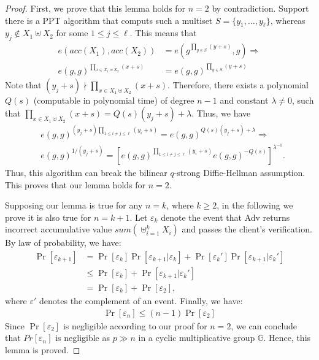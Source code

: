 \begin{proof}
  First, we prove that this lemma holds for $n=2$ by contradiction. Support there is a PPT algorithm that computs such a multiset $S = \{y_1, \dots, y_{\ell}\}$, whereas $y_j \notin X_1 \uplus X_2$ for some $1 \le j \le \ell$. This means that
  \begin{align*}
    e(acc(X_1), acc(X_2)) &= e(g^{\prod_{y \in S} (y+s)}, g) \Rightarrow \\
    {e(g, g)}^{\prod_{x \in X_1 \uplus X_2} (x+s) } &= {e(g, g)}^{\prod_{y \in S} (y+s)}
  \end{align*}
  Note that $(y_j + s)  \nmid \prod_{x \in X_1 \uplus X_2} (x+s)$. Therefore, there exists a polynomial $Q(s)$ (computable in polynomial time) of degree $n-1$ and constant $\lambda \neq 0$, such that $\prod_{x \in X_1 \uplus X_2} (x+s) = Q(s)(y_j + s) + \lambda$. Thus, we have
  \begin{align*}
& {e(g, g)}^{(y_j + s)\prod_{1 \le i \neq j \le \ell} (y_i+s)} = {e(g,g)}^{Q(s)(y_j + s) + \lambda} \Rightarrow \\
& {e(g, g)}^{1/(y_j + s)} = {\left[ {e(g,g)}^{\prod_{1 \le i \neq j \le \ell} (y_i+s)} {e(g,g)}^{-Q(s)} \right]}^{\lambda^{-1}}.
  \end{align*}
  Thus, this algorithm can break the bilinear $q$-strong Diffie-Hellman assumption. This proves that our lemma holds for $n=2$.

  Supposing our lemma is true for any $n=k$, where $k\ge 2$, in the following we prove it is also true for $n=k+1$. Let $\varepsilon_k$ denote the event that \textsf{Adv} returns incorrect accumulative value $sum(\uplus_{i=1}^{k} X_i)$ and passes the client's verification. By law of probability, we have:
  \begin{align*}
    \Pr[\varepsilon_{k+1}] &=  \Pr[\varepsilon_{k}]\Pr[\varepsilon_{k+1} | \varepsilon_{k}] +
    \Pr[\varepsilon_{k}']\Pr[\varepsilon_{k+1} | \varepsilon_{k}']\\
                           &\leq \Pr[\varepsilon_{k}] + \Pr[\varepsilon_{k+1}|\varepsilon_{k}'] \\
                           &= \Pr[\varepsilon_{k}] + \Pr[\varepsilon_{2}],
  \end{align*}
  where $\varepsilon'$ denotes the complement of an event. Finally, we have:
  \begin{align*}
    \Pr[\varepsilon_n] \leq (n-1) \Pr[\varepsilon_2]
  \end{align*}
  Since $\Pr[\varepsilon_2]$ is negligible according to our proof for $n=2$, we can conclude that $Pr[\varepsilon_{n}]$ is negligible as $p\gg n$ in a cyclic multiplicative group $\mathbb{G}$. Hence, this lemma is proved.
\end{proof}

